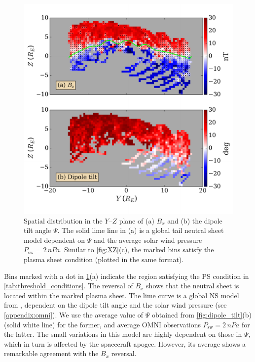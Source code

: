 \documentclass[draft]{agujournal2019}
\begin{document}
\begin{figure}
\centering
\noindent\includegraphics[width=\textwidth]{2023JA031358R-f07.pdf}
\caption{
Spatial distribution in the $Y$--$Z$ plane of (a) $B_x$ and (b) the dipole tilt angle $\Psi$. The solid lime line in (a) is a global tail neutral sheet model \cite{Xiao2016} dependent on $\Psi$ and the average solar wind pressure ${P_\text{sw}=2\,\si{nPa}}$. Similar to \cref{fig:XZ}(c), the marked bins satisfy the plasma sheet condition  (plotted in the same format).
}
\label{fig:YZ}
\end{figure}

Bins marked with a dot in \cref{fig:YZ}(a) indicate the region satisfying the PS condition in \mbox{\cref{tab:threshold_conditions}}. The reversal of $B_x$ shows that the neutral sheet is located within the marked plasma sheet. The lime curve is a global NS model from , dependent on the dipole tilt angle and the solar wind pressure (see \ref{appendix:omni}). We use the average value of $\Psi$ obtained from \cref{fig:dipole_tilt}(b) (solid white line) for the former, and average OMNI observations ${P_\text{sw}=2\,\si{nPa}}$ for the latter. The small variations in this model are highly dependent on those in $\Psi$, which in turn is affected by the spacecraft apogee. However, its average shows a remarkable agreement with the $B_x$ reversal. 
\end{document}
